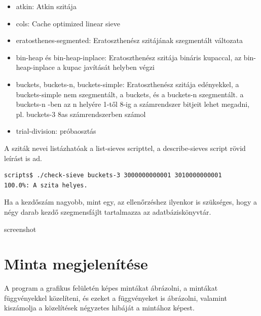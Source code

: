 \documentclass[12pt]{report}
\begin{document}
\begin{itemize}
\item atkin: Atkin szitája
\item cols: Cache optimized linear sieve
\item eratosthenes-segmented: Eratoszthenész szitájának szegmentált változata
\item bin-heap és bin-heap-inplace: Eratoszthenész szitája bináris kupaccal,
	az bin-heap-inplace a kupac javítását helyben végzi
\item buckets, buckets-n, buckets-simple: Eratoszthenész szitája edényekkel,
	a buckets-simple nem szegmentált, a buckets, és a buckets-n szegmentált.
	a buckets-n -ben az n helyére 1-től 8-ig a számrendszer bitjeit lehet megadni,
	pl. buckets-3 8as számrendszerben számol
\item trial-division: próbaosztás
\end{itemize}

A sziták nevei listázhatóak a list-sieves scripttel, a describe-sieves script rövid leírást
is ad.

{\tiny
\begin{lstlisting}[language=bash]
scripts$ ./check-sieve buckets-3 3000000000001 3010000000001
100.0%: A szita helyes.
\end{lstlisting}
}

Ha a kezdőszám nagyobb, mint egy, az ellenőrzéshez ilyenkor is szükséges,
hogy a négy darab kezdő szegmensfájlt tartalmazza az adatbáziskönyvtár.

{\color{red}screenshot}

\section{Minta megjelenítése} %

A program a grafikus felületén képes mintákat ábrázolni, a mintákat függvényekkel
közelíteni, és ezeket a függvényeket is ábrázolni, valamint kiszámolja a közelítések
négyzetes hibáját a mintához képest.
\end{document}
